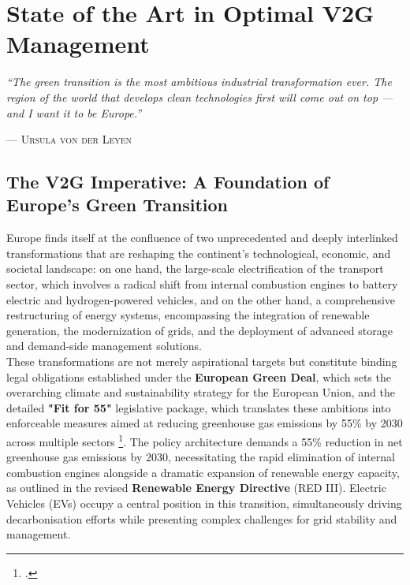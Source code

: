 \chapter{State of the Art in Optimal V2G Management}
\vspace*{2cm} %

\begin{center}
  \begin{minipage}{0.85\textwidth}
    \begin{displayquote}
      \large\itshape
      ``The green transition is the most ambitious industrial transformation ever. 
      The region of the world that develops clean technologies first will come out on top — 
      and I want it to be Europe.''
    \end{displayquote}
  \end{minipage}
\end{center}

\vspace{0.5cm}

\begin{flushright}
  --- \textsc{Ursula von der Leyen}
\end{flushright}

\section{The V2G Imperative: A Foundation of Europe's Green Transition}


Europe finds itself at the confluence of two unprecedented and deeply interlinked transformations that are reshaping the continent’s technological, economic, and societal landscape: on one hand, the large-scale electrification of the transport sector, which involves a radical shift from internal combustion engines to battery electric and hydrogen-powered vehicles, and on the other hand, a comprehensive restructuring of energy systems, encompassing the integration of renewable generation, the modernization of grids, and the deployment of advanced storage and demand-side management solutions.
\noindent
\\
These transformations are not merely aspirational targets but constitute binding legal obligations established under the \textbf{European Green Deal}, which sets the overarching climate and sustainability strategy for the European Union, and the detailed \textbf{"Fit for 55"} legislative package, which translates these ambitions into enforceable measures aimed at reducing greenhouse gas emissions by 55\% by 2030 across multiple sectors \footcite{european_commission_2021_fit_for_55}.
 The policy architecture demands a 55\% reduction in net greenhouse gas emissions by 2030, necessitating the rapid elimination of internal combustion engines alongside a dramatic expansion of renewable energy capacity, as outlined in the revised \textbf{Renewable Energy Directive }(RED III). Electric Vehicles (EVs) occupy a central position in this transition, simultaneously driving decarbonisation efforts while presenting complex challenges for grid stability and management.
\noindent

